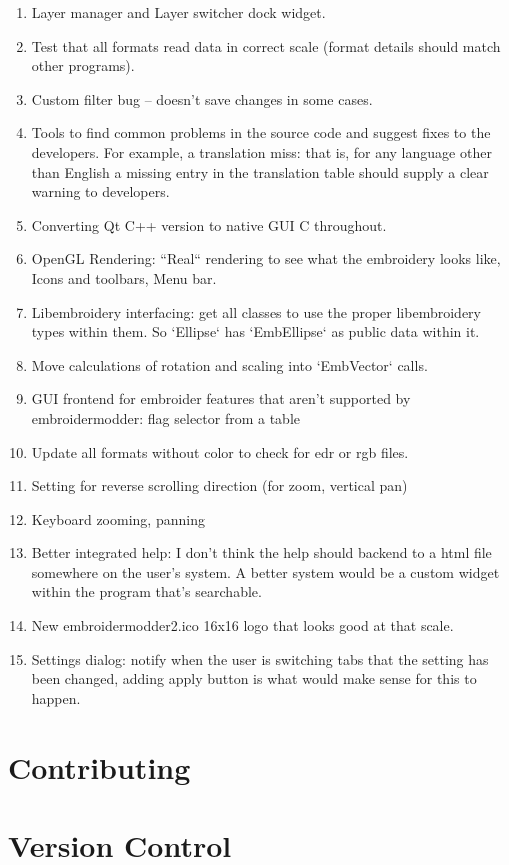 \begin{enumerate}
\item Layer manager and Layer switcher dock widget.
\item Test that all formats read data in correct scale (format details should match other programs).
\item Custom filter bug -- doesn't save changes in some cases.
\item Tools to find common problems in the source code and suggest fixes to the developers. For example, a translation miss: that is, for any language other than English a missing entry in the translation table should supply a clear warning to developers.
\item Converting Qt C++ version to native GUI C throughout.
\item OpenGL Rendering: ``Real`` rendering to see what the embroidery looks like, Icons and toolbars, Menu bar.
\item Libembroidery interfacing: get all classes to use the proper libembroidery types within them. So `Ellipse` has `EmbEllipse` as public data within it.
\item Move calculations of rotation and scaling into `EmbVector` calls.
\item GUI frontend for embroider features that aren't supported by embroidermodder: flag selector from a table
\item Update all formats without color to check for edr or rgb files.
\item Setting for reverse scrolling direction (for zoom, vertical pan)
\item Keyboard zooming, panning
\item Better integrated help: I don't think the help should backend to a html file somewhere on the user's system. A better system would be a custom widget within the program that's searchable.
\item New embroidermodder2.ico 16x16 logo that looks good at that scale.
\item Settings dialog: notify when the user is switching tabs that the setting has been changed, adding apply button is what would make sense for this to happen.
\end{enumerate}

\section{Contributing}

\section{Version Control}

